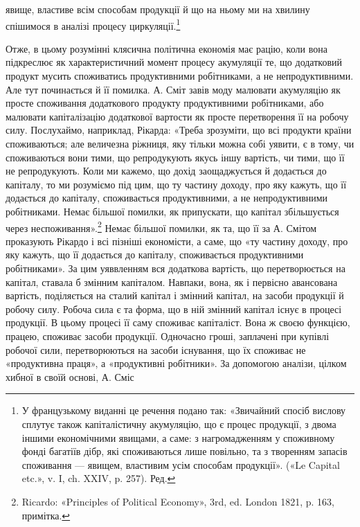 \parcont{}  %
явище, властиве всім способам продукції й що на ньому ми на
хвилину спішимося в аналізі процесу циркуляції.\footnote*{
У французькому виданні це речення подано так: «Звичайний спосіб
вислову сплутує також капіталістичну акумуляцію, що є процес
продукції, з двома іншими економічними явищами, а саме: з нагромадженням
у споживному фонді багатіїв дібр, які споживаються лише
повільно, та з творенням запасів споживання — явищем, властивим усім
способам продукції». («Le Capital etc.», v. I, ch. XXIV, p. 257). Ред.
}

Отже, в цьому розумінні клясична політична економія має
рацію, коли вона підкреслює як характеристичний момент процесу
акумуляції те, що додатковий продукт мусить споживатись
продуктивними робітниками, а не непродуктивними. Але тут починається
й її помилка. А. Сміт завів моду малювати акумуляцію як
просте споживання додаткового продукту продуктивними робітниками,
або малювати капіталізацію додаткової вартости як просте
перетворення її на робочу силу. Послухаймо, наприклад, Рікарда:
«Треба зрозуміти, що всі продукти країни споживаються; але величезна
ріжниця, яку тільки можна собі уявити, є в тому, чи споживаються
вони тими, що репродукують якусь іншу вартість, чи тими,
що її не репродукують. Коли ми кажемо, що дохід заощаджується
й додається до капіталу, то ми розуміємо під цим, що ту частину
доходу, про яку кажуть, що її додається до капіталу, споживається
продуктивними, а не непродуктивними робітниками. Немає
більшої помилки, як припускати, що капітал збільшується через
неспоживання».\footnote{
Ricardo: «Principles of Political Economy», 3rd, ed. London
1821, p. 163, примітка.
} Немає більшої помилки, як та, що її за
А. Смітом проказують Рікардо і всі пізніші економісти, а саме,
що «ту частину доходу, про яку кажуть, що її додається до капіталу,
споживається продуктивними робітниками». За цим уяввленням
вся додаткова вартість, що перетворюється на капітал,
ставала б змінним капіталом. Навпаки, вона, як і первісно авансована
вартість, поділяється на сталий капітал і змінний капітал,
на засоби продукції й робочу силу. Робоча сила є та форма, що
в ній змінний капітал існує в процесі продукції. В цьому процесі
її саму споживає капіталіст. Вона ж своєю функцією, працею,
споживає засоби продукції. Одночасно гроші, заплачені при
купівлі робочої сили, перетворюються на засоби існування, що
їх споживає не «продуктивна праця», а «продуктивні робітники».
За допомогою аналізи, цілком хибної в своїй основі, А. Сміс
